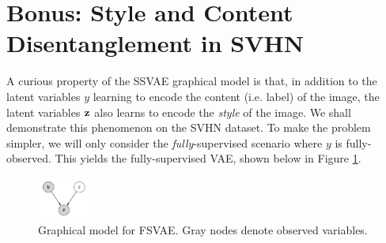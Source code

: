 \section{Bonus: Style and Content Disentanglement in SVHN}

A curious property of the SSVAE graphical model is that, in addition to the latent variables $y$ learning to encode the content 
(i.e. label) of the image, the latent variables $\mathbf{z}$ also learns to encode the \textit{style} of the image. We shall 
demonstrate this phenomenon on the SVHN dataset. To make the problem simpler, we will only consider the 
\textit{fully}-supervised scenario where $y$ is fully-observed. This yields the fully-supervised VAE, shown below in Figure \ref{fig:fsvae}.

\begin{figure}[h]
    \centering
    \includegraphics[width=0.15\textwidth]{./figures/fsvae}
    \caption{Graphical model for FSVAE. Gray nodes denote observed variables.}
    \label{fig:fsvae}
\end{figure}


